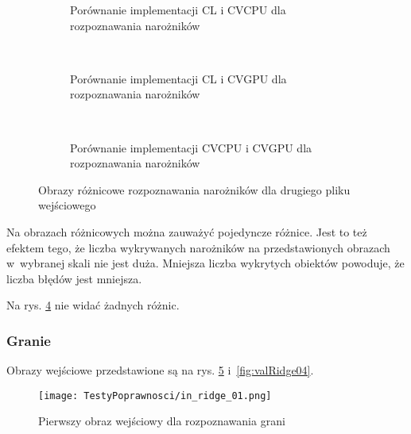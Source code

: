 \begin{figure}[h]
\begin{subfigure}[t]{0.3\textwidth}
	\centering
	\setlength\fboxsep{0pt}
	\setlength\fboxrule{0.5pt}
	\caption{Porównanie implementacji CL i CVCPU dla rozpoznawania narożników}
	\label{fig:valCorner2CLCVCPU}
\end{subfigure}
~
\begin{subfigure}[t]{0.3\textwidth}
	\centering
	\setlength\fboxsep{0pt}
	\setlength\fboxrule{0.5pt}
	\caption{Porównanie implementacji CL i CVGPU dla rozpoznawania narożników}
	\label{fig:valCorner2CLCVGPU}
\end{subfigure}
~
\begin{subfigure}[t]{0.3\textwidth}
	\centering
	\setlength\fboxsep{0pt}
	\setlength\fboxrule{0.5pt}
	\caption{Porównanie implementacji CVCPU i CVGPU dla rozpoznawania narożników}
	\label{fig:valCorner2CVCPUCVGPU}                 
\end{subfigure}
\caption{Obrazy różnicowe rozpoznawania narożników dla drugiego pliku wejściowego}

\label{fig:valCorner2}
\end{figure}

Na obrazach różnicowych można zauważyć pojedyncze różnice. Jest to też efektem tego, że liczba wykrywanych narożników na przedstawionych obrazach w~wybranej skali nie jest duża. Mniejsza liczba wykrytych obiektów powoduje, że liczba błędów jest mniejsza.

Na rys. \ref{fig:valCorner2} nie widać żadnych różnic.

\subsubsection{Granie}
\label{subsubsec:granieRysunki}

Obrazy wejściowe przedstawione są na rys. \ref{fig:valRidge01} i~\ref{fig:valRidge04}.

\begin{figure}[h]
\begin{center}
\texttt{[image: TestyPoprawnosci/in\_ridge\_01.png]}
\end{center}
\caption{Pierwszy obraz wejściowy dla rozpoznawania grani}
\label{fig:valRidge01}
\end{figure}

